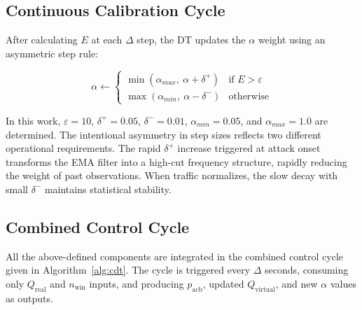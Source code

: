 \documentclass[conference]{IEEEtran}
\newcommand{\qreal}{Q_{\mathrm{real}}}
\newcommand{\qvirt}{Q_{\mathrm{virtual}}}
\newcommand{\pacb}{p_{\mathrm{acb}}}
\begin{document}
\subsection{Continuous Calibration Cycle}

After calculating $E$ at each $\Delta$ step, the DT updates the $\alpha$ weight using an asymmetric step rule:

\begin{equation}
\alpha \leftarrow \begin{cases}
    \min(\alpha_{max},\ \alpha + \delta^{+}) & \text{if } E > \varepsilon \\
    \max(\alpha_{min},\ \alpha - \delta^{-}) & \text{otherwise}
\end{cases}
\label{eq:calibration}
\end{equation}

\noindent In this work, $\varepsilon = 10$, $\delta^{+} = 0.05$, $\delta^{-} = 0.01$, $\alpha_{min} = 0.05$, and $\alpha_{max} = 1.0$ are determined. The intentional asymmetry in step sizes reflects two different operational requirements. The rapid $\delta^{+}$ increase triggered at attack onset transforms the EMA filter into a high-cut frequency structure, rapidly reducing the weight of past observations. When traffic normalizes, the slow decay with small $\delta^{-}$ maintains statistical stability.

\subsection{Combined Control Cycle}

All the above-defined components are integrated in the combined control cycle given in Algorithm~\ref{alg:cdt}. The cycle is triggered every $\Delta$ seconds, consuming only $\qreal$ and $n_{\mathrm{win}}$ inputs, and producing $\pacb$, updated $\qvirt$, and new $\alpha$ values as outputs.
\end{document}

